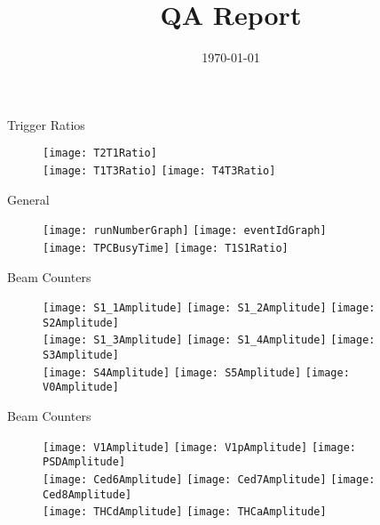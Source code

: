 \documentclass[11pt]{beamer}
\title[QA]{QA Report}
\date{\today}
\begin{document}
\begin{frame}
  \titlepage
\end{frame}

\begin{frame}{Trigger Ratios}
\begin{figure}
\centering
\texttt{[image: T2T1Ratio]} \\
\texttt{[image: T1T3Ratio]}
\texttt{[image: T4T3Ratio]} \\
\end{figure}
\end{frame}

\begin{frame}{General}
\begin{figure}
\centering
\texttt{[image: runNumberGraph]}
\texttt{[image: eventIdGraph]} \\
\texttt{[image: TPCBusyTime]}
\texttt{[image: T1S1Ratio]} \\
\end{figure}
\end{frame}

\begin{frame}{Beam Counters}
\begin{figure}
\centering
\texttt{[image: S1\_1Amplitude]} 
\texttt{[image: S1\_2Amplitude]}
\texttt{[image: S2Amplitude]} \\
\texttt{[image: S1\_3Amplitude]}
\texttt{[image: S1\_4Amplitude]}
\texttt{[image: S3Amplitude]} \\
\texttt{[image: S4Amplitude]}
\texttt{[image: S5Amplitude]} 
\texttt{[image: V0Amplitude]} \\
\end{figure}
\end{frame}

\begin{frame}{Beam Counters}
\begin{figure}
\centering
\texttt{[image: V1Amplitude]} 
\texttt{[image: V1pAmplitude]}
\texttt{[image: PSDAmplitude]} \\
\texttt{[image: Ced6Amplitude]}
\texttt{[image: Ced7Amplitude]} 
\texttt{[image: Ced8Amplitude]} \\
\texttt{[image: THCdAmplitude]} 
\texttt{[image: THCaAmplitude]} 
\end{figure}
\end{frame}
\end{document}
